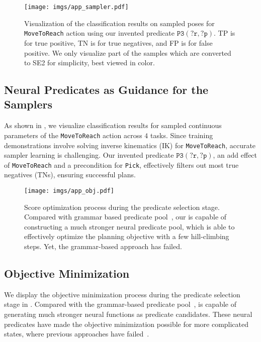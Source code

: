\begin{figure}[!t]
	\centering
	\texttt{[image: imgs/app\_sampler.pdf]}
	\caption{Visualization of the classification results on sampled poses for \texttt{MoveToReach} action using our invented predicate $\mathtt{P3(?r,?p)}$. TP is for true positive, TN is for true negatives, and FP is for false positive. We only visualize part of the samples which are converted to SE2 for simplicity, best viewed in color.}
	\label{fig:vis_sample}
\end{figure}

\subsection{Neural Predicates as Guidance for the Samplers}\label{app:sampler_vis} 
As shown in , we visualize classification results for sampled continuous parameters of the \texttt{MoveToReach} action across $4$ tasks. 
Since training demonstrations involve solving inverse kinematics (IK) for \texttt{MoveToReach}, accurate sampler learning is challenging.
Our invented predicate $\mathtt{P3(?r,?p)}$, an add effect of \texttt{MoveToReach} and a precondition for \texttt{Pick}, effectively filters out most true negatives (TNs), ensuring successful plans.

\begin{figure}[!t]
	\centering
	\texttt{[image: imgs/app\_obj.pdf]}
 \vspace{-0.4cm}
	\caption{Score optimization process during the predicate selection stage. Compared with grammar based predicate pool~\cite{silver2023predicateinvent}, our \model{} is capable of constructing a much stronger neural predicate pool, which is able to effectively optimize the planning objective with a few hill-climbing steps. Yet, the grammar-based approach has failed.
    }
    \vspace{-0.4cm}
	\label{fig:ana_objective}
\end{figure}

\subsection{Objective Minimization}\label{app:objective}
We display the objective minimization process during the predicate selection stage in .
Compared with the grammar-based predicate pool~\cite{silver2023predicateinvent}, \model{} is capable of generating much stronger neural functions as predicate candidates.
These neural predicates have made the objective minimization possible for more complicated states, where previous approaches have failed~\cite{silver2023predicateinvent}.